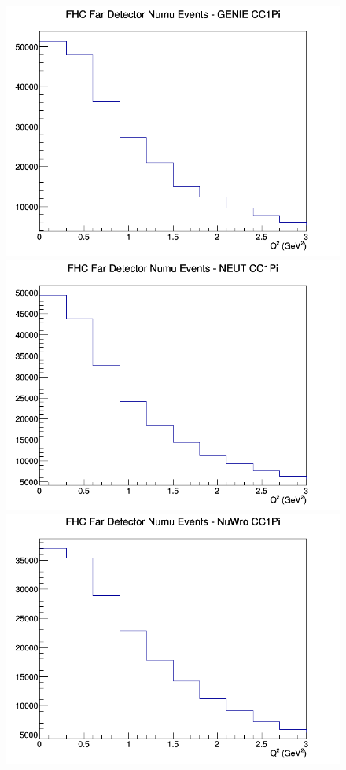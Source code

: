 \documentclass[12pt]{article}
\begin{document}
\begin{figure}[h]
\endminipage
\newline
{}
\includegraphics[width=\linewidth]{Q2/nominal/CC1Pi_FHC_FD_numu_Q2_GENIE.png}
\endminipage
{}
\includegraphics[width=\linewidth]{Q2/nominal/CC1Pi_FHC_FD_numu_Q2_NEUT.png}
\endminipage
{}
\includegraphics[width=\linewidth]{Q2/nominal/CC1Pi_FHC_FD_numu_Q2_NuWro.png}

\end{figure}
\end{document}
